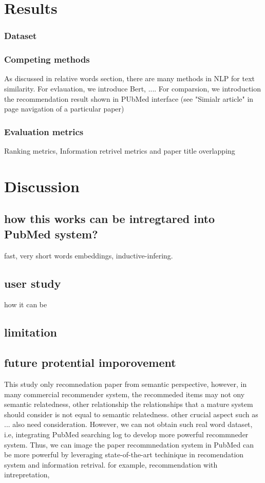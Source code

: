 \documentclass[11pt]{article}
\begin{document}
    \section{Results}
    \subsubsection{Dataset}


    \subsubsection{Competing methods}
    As discussed in relative words section, there are many methods in NLP for text similarity. For evlauation, we introduce Bert, .... For comparsion, we introduction the recommendation result shown in PUbMed interface (see "Simialr article" in page navigation of a particular paper)
    \subsubsection{Evaluation metrics}
    Ranking metrics, Information retrivel metrics and paper title overlapping



    \section{Discussion}

    \subsection{how this works can be intregtared into PubMed system?}
    fast, very short words embeddings, inductive-infering.

    \subsection{user study}
    how it can be

    \subsection{limitation}

    \subsection{future protential imporovement}

    This study only recomnedation paper from semantic perspective, however, in many commercial recommender system, the recommeded items may not ony semantic relatedness, other relationship
    the relationships that a mature system should consider is not equal to semantic relatedness. other crucial aspect such as ... also need consideration.
    However, we can not obtain such real word dataset, i.e, integrating PubMed searching log to develop more powerful recommneder system.
    Thus, we can image the paper recommnedation system in PubMed can be more powerful by leveraging state-of-the-art techinique in recomendation system and information retrival.
    for example, recommendation with intrepretation,
\end{document}
